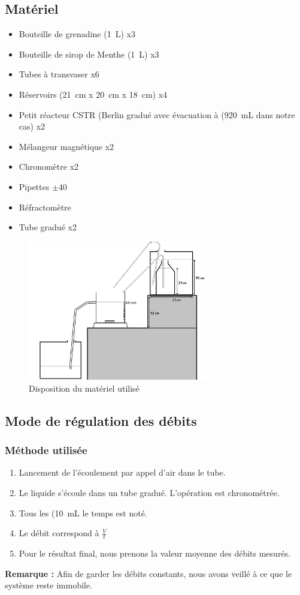 \documentclass[a4paper,11pt, french]{article}
\begin{document}
	\subsection{Matériel}
		\begin{itemize}
			\item Bouteille de grenadine (\SI{1}{\liter}) x3
			\item Bouteille de sirop de Menthe (\SI{1}{\liter}) x3
			\item Tubes à transvaser x6
			\item Réservoirs (\SI{21}{\centi\meter} x \SI{20}{\centi\meter} x \SI{18}{\centi\meter}) x4
			\item Petit réacteur CSTR (Berlin gradué avec évacuation à (\SI{920}{\milli\liter} dans notre cas) x2
			\item Mélangeur magnétique x2
			\item Chronomètre x2
			\item Pipettes $\pm$40
			\item Réfractomètre
			\item Tube gradué x2	
		\end{itemize}
		\begin{figure}[h]
			\centering
			\includegraphics[width=0.7\textwidth]{pictures/materiel.png}
			\caption{Disposition du matériel utilisé}
		\end{figure}	
		
	\subsection{Mode de régulation des débits}
		\subsubsection{Méthode utilisée}
			\begin{enumerate}
				\item Lancement de l'écoulement par appel d'air dans le tube.
				\item Le liquide s'écoule dans un tube gradué. L'opération est chronométrée.
				\item Tous les (\SI{10}{\milli\liter} le temps est noté. 
				\item Le débit correspond à $\frac{V}{t}$
				\item Pour le résultat final, nous prenons la valeur moyenne des débits mesurés.
			\end{enumerate}
			\textbf{Remarque :} Afin de garder les débits constants, nous avons veillé à ce que le système reste immobile.
			
\end{document}
